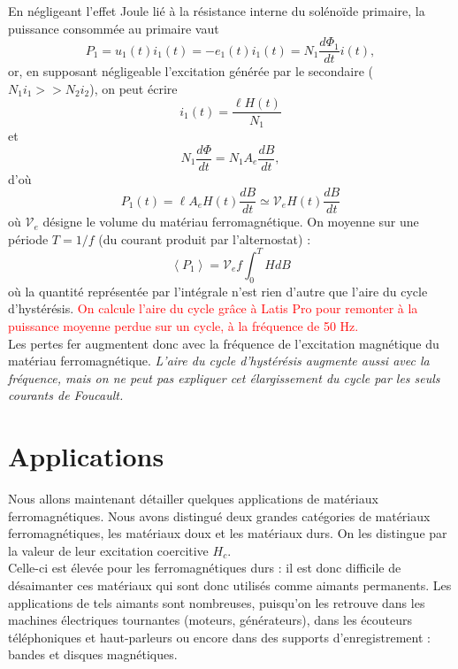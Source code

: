 \documentclass[11pt,a4paper]{report}
\begin{document}
En négligeant l'effet Joule lié à la résistance interne du solénoïde primaire, la puissance consommée au primaire vaut
\begin{equation}
	P_1 = u_1(t) i_1(t) = - e_1(t) i_1(t) = N_1\frac{d\Phi_1}{dt}i(t),
\end{equation}
or, en supposant négligeable l'excitation générée par le secondaire ($N_1 i_1  >> N_2 i_2$), on peut écrire
\begin{equation}
	i_1(t) = \frac{\ell H(t)}{N_1}
\end{equation}
et
\begin{equation}
	N_1 \frac{d\Phi}{dt} = N_1 A_e \frac{dB}{dt},
\end{equation}
d'où
\begin{equation}
	P_1(t) = \ell A_e H(t) \frac{dB}{dt} \simeq \mathcal{V}_e H(t) \frac{dB}{dt}
\end{equation}
où $\mathcal{V}_e$ désigne le volume du matériau ferromagnétique. On moyenne sur une période $T = 1/f$ (du courant produit par l'alternostat) :
\begin{equation}
	\boxed{\left\langle P_1 \right\rangle = \mathcal{V}_e f \int_0^T HdB}
\end{equation}
où la quantité représentée par l'intégrale n'est rien d'autre que l'aire du cycle d'hystérésis. \textcolor{red}{On calcule l'aire du cycle grâce à Latis Pro pour remonter à la puissance moyenne perdue sur un cycle, à la fréquence de 50 Hz.}\\

Les pertes fer augmentent donc avec la fréquence de l'excitation magnétique du matériau ferromagnétique. \textit{L'aire du cycle d'hystérésis augmente aussi avec la fréquence, mais on ne peut pas expliquer cet élargissement du cycle par les seuls courants de Foucault.}\\

\newpage
\section{Applications}

Nous allons maintenant détailler quelques applications de matériaux ferromagnétiques. Nous avons distingué deux grandes catégories de matériaux ferromagnétiques, les matériaux doux et les matériaux durs. On les distingue par la valeur de leur excitation coercitive $H_c$.\\

Celle-ci est élevée pour les ferromagnétiques durs : il est donc difficile de désaimanter ces matériaux qui sont donc utilisés comme aimants permanents. Les applications de tels aimants sont nombreuses, puisqu'on les retrouve dans les machines électriques tournantes (moteurs, générateurs), dans les écouteurs téléphoniques et haut-parleurs ou encore dans des supports d'enregistrement : bandes et disques magnétiques.\\
\end{document}
